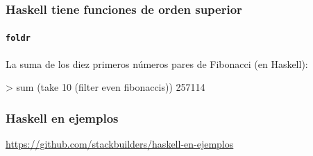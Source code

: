 \documentclass[spanish]{beamer}
\begin{document}
\begin{frame}[fragile]
  \frametitle{Haskell tiene funciones de orden superior}
  \framesubtitle{\texttt{foldr}}

  La suma de los diez primeros números pares de Fibonacci (en
  Haskell):
  \begin{code}
> sum (take 10 (filter even fibonaccis))
257114
  \end{code}
\end{frame}


\begin{frame}
  \frametitle{Haskell en ejemplos}

  \begin{center}
    \url{https://github.com/stackbuilders/haskell-en-ejemplos}
  \end{center}
\end{frame}

\end{document}
